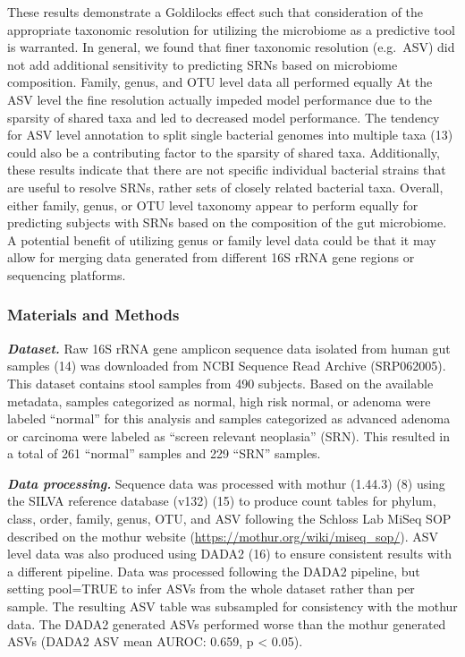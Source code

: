 \documentclass[
]{article}
\begin{document}
These results demonstrate a Goldilocks effect such that consideration of
the appropriate taxonomic resolution for utilizing the microbiome as a
predictive tool is warranted. In general, we found that finer taxonomic
resolution (e.g.~ASV) did not add additional sensitivity to predicting
SRNs based on microbiome composition. Family, genus, and OTU level data
all performed equally At the ASV level the fine resolution actually
impeded model performance due to the sparsity of shared taxa and led to
decreased model performance. The tendency for ASV level annotation to
split single bacterial genomes into multiple taxa (13) could also be a
contributing factor to the sparsity of shared taxa. Additionally, these
results indicate that there are not specific individual bacterial
strains that are useful to resolve SRNs, rather sets of closely related
bacterial taxa. Overall, either family, genus, or OTU level taxonomy
appear to perform equally for predicting subjects with SRNs based on the
composition of the gut microbiome. A potential benefit of utilizing
genus or family level data could be that it may allow for merging data
generated from different 16S rRNA gene regions or sequencing platforms.

\hypertarget{materials-and-methods}{%
\subsubsection{Materials and Methods}\label{materials-and-methods}}

\textbf{\emph{Dataset.}} Raw 16S rRNA gene amplicon sequence data
isolated from human gut samples (14) was downloaded from NCBI Sequence
Read Archive (SRP062005). This dataset contains stool samples from 490
subjects. Based on the available metadata, samples categorized as
normal, high risk normal, or adenoma were labeled ``normal'' for this
analysis and samples categorized as advanced adenoma or carcinoma were
labeled as ``screen relevant neoplasia'' (SRN). This resulted in a total
of 261 ``normal'' samples and 229 ``SRN'' samples.

\textbf{\emph{Data processing.}} Sequence data was processed with mothur
(1.44.3) (8) using the SILVA reference database (v132) (15) to produce
count tables for phylum, class, order, family, genus, OTU, and ASV
following the Schloss Lab MiSeq SOP described on the mothur website
(\url{https://mothur.org/wiki/miseq_sop/}). ASV level data was also
produced using DADA2 (16) to ensure consistent results with a different
pipeline. Data was processed following the DADA2 pipeline, but setting
pool=TRUE to infer ASVs from the whole dataset rather than per sample.
The resulting ASV table was subsampled for consistency with the mothur
data. The DADA2 generated ASVs performed worse than the mothur generated
ASVs (DADA2 ASV mean AUROC: 0.659, p \textless{} 0.05).
\end{document}
